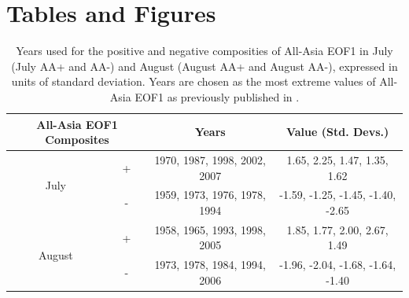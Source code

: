\clearpage
\newpage	
\section{Tables and Figures}


\begin{table}[p]

\caption{Years used for the positive and negative composities of All-Asia EOF1 in July (July AA+ and AA-) and August (August AA+ and August AA-), expressed in units of standard deviation. Years are chosen as the most extreme values of All-Asia EOF1 as previously published in \citet{Day2015}.}
\centering

\begin{tabular}{ c c c c}
	 	 		\multicolumn{2}{c}{All-Asia EOF1 Composites} 	&			Years				&		Value (Std. Devs.)			\tabularnewline	
				\hline
	 \multirow{2}{*}{July} 		&  +							&	1970, 1987, 1998, 2002, 2007 	&	1.65, 2.25, 1.47, 1.35, 1.62		\tabularnewline
	 						&  -							&	1959, 1973, 1976, 1978, 1994       &	-1.59, -1.25, -1.45, -1.40, -2.65	\tabularnewline
	 \multirow{2}{*}{August}	&  + 							&	1958, 1965, 1993, 1998, 2005	&	1.85, 1.77, 2.00, 2.67, 1.49		\tabularnewline
	 						&  -  							&	1973, 1978, 1984, 1994, 2006	&	-1.96, -2.04, -1.68, -1.64, -1.40 	\tabularnewline

\end{tabular}
\label{tab:t41}
\end{table}

%
%
%
%

